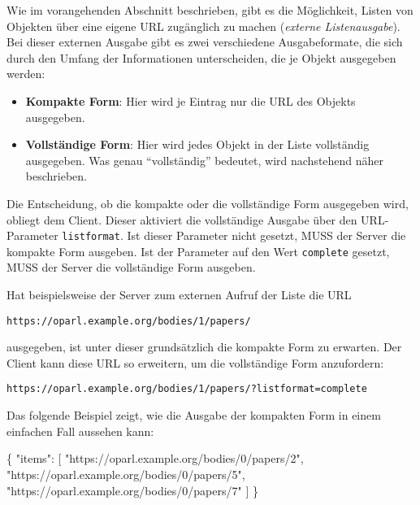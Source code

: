 \documentclass[,a4paper]{article}
\newenvironment{Shaded}{}{}
\newcommand{\DataTypeTok}[1]{\textcolor[rgb]{0.56,0.13,0.00}{{#1}}}
\newcommand{\StringTok}[1]{\textcolor[rgb]{0.25,0.44,0.63}{{#1}}}
\newcommand{\OtherTok}[1]{\textcolor[rgb]{0.00,0.44,0.13}{{#1}}}
\newcommand{\FunctionTok}[1]{\textcolor[rgb]{0.02,0.16,0.49}{{#1}}}
\begin{document}

Wie im vorangehenden Abschnitt beschrieben, gibt es die Möglichkeit,
Listen von Objekten über eine eigene URL zugänglich zu machen
(\emph{externe Listenausgabe}). Bei dieser externen Ausgabe gibt es zwei
verschiedene Ausgabeformate, die sich durch den Umfang der Informationen
unterscheiden, die je Objekt ausgegeben werden:

\begin{itemize}
\item
  \textbf{Kompakte Form}: Hier wird je Eintrag nur die URL des Objekts
  ausgegeben.
\item
  \textbf{Vollständige Form}: Hier wird jedes Objekt in der Liste
  vollständig ausgegeben. Was genau ``vollständig'' bedeutet, wird
  nachstehend näher beschrieben.
\end{itemize}

Die Entscheidung, ob die kompakte oder die vollständige Form ausgegeben
wird, obliegt dem Client. Dieser aktiviert die vollständige Ausgabe über
den URL-Parameter \texttt{listformat}. Ist dieser Parameter nicht
gesetzt, MUSS der Server die kompakte Form ausgeben. Ist der Parameter
auf den Wert \texttt{complete} gesetzt, MUSS der Server die vollständige
Form ausgeben.

Hat beispielsweise der Server zum externen Aufruf der Liste die URL

\begin{verbatim}
https://oparl.example.org/bodies/1/papers/
\end{verbatim}

ausgegeben, ist unter dieser grundsätzlich die kompakte Form zu
erwarten. Der Client kann diese URL so erweitern, um die vollständige
Form anzufordern:

\begin{verbatim}
https://oparl.example.org/bodies/1/papers/?listformat=complete
\end{verbatim}

Das folgende Beispiel zeigt, wie die Ausgabe der kompakten Form in einem
einfachen Fall aussehen kann:

\begin{Shaded}
\begin{Highlighting}[]
\FunctionTok{\{}
    \DataTypeTok{"items"}\FunctionTok{:} \OtherTok{[}
        \StringTok{"https://oparl.example.org/bodies/0/papers/2"}\OtherTok{,}
        \StringTok{"https://oparl.example.org/bodies/0/papers/5"}\OtherTok{,}
        \StringTok{"https://oparl.example.org/bodies/0/papers/7"}
    \OtherTok{]}
\FunctionTok{\}}
\end{Highlighting}
\end{Shaded}
\end{document}
